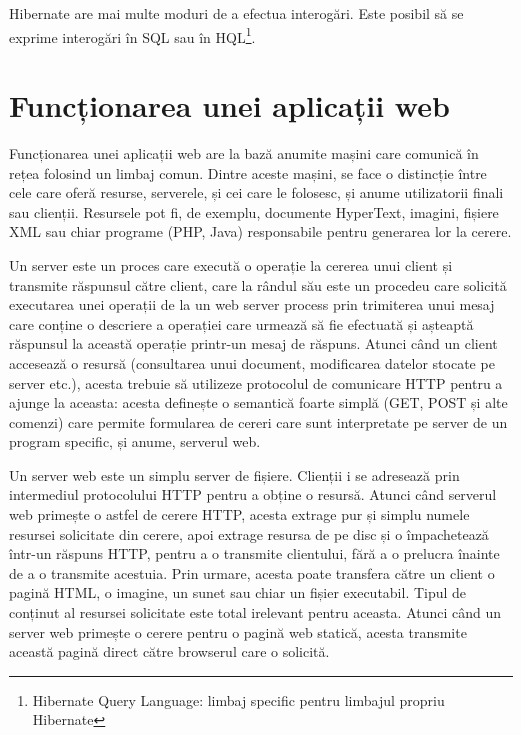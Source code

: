 Hibernate are mai multe moduri de a efectua interogări. Este posibil să se exprime interogări în SQL sau în HQL\footnote{Hibernate Query Language: limbaj specific pentru limbajul propriu Hibernate}.\newline

\section{Funcționarea unei aplicații web}

Funcționarea unei aplicații web are la bază anumite mașini care comunică în rețea folosind un limbaj comun.
Dintre aceste mașini, se face o distincție între cele care oferă resurse, serverele, și cei care le folosesc, și anume utilizatorii finali sau clienții. Resursele pot fi, de exemplu, documente HyperText, imagini, fișiere XML sau chiar programe (PHP, Java) responsabile pentru generarea lor la cerere.\newline

Un server este un proces care execută o operație la cererea unui client și transmite răspunsul către client, care la rândul său este un procedeu care solicită executarea unei operații de la un web server process prin trimiterea unui mesaj care conține o descriere a operației care urmează să fie efectuată și așteaptă răspunsul la această operație printr-un mesaj de răspuns.
Atunci când un client accesează o resursă (consultarea unui document, modificarea datelor stocate pe server etc.), acesta trebuie să utilizeze protocolul de comunicare HTTP pentru a ajunge la aceasta: acesta definește o semantică foarte simplă (GET, POST și alte comenzi) care permite formularea de cereri care sunt interpretate pe server de un program specific, și anume, serverul web.\newline

Un server web este un simplu server de fișiere. Clienții i se adresează prin intermediul protocolului HTTP pentru a obține o resursă. Atunci când serverul web primește o astfel de cerere HTTP, acesta extrage pur și simplu numele resursei solicitate din cerere, apoi extrage resursa de pe disc și o împachetează într-un răspuns HTTP, pentru a o transmite clientului, fără a o prelucra înainte de a o transmite acestuia. Prin urmare, acesta poate transfera către un client o pagină HTML, o imagine, un sunet sau chiar un fișier executabil. Tipul de conținut al resursei solicitate este total irelevant pentru aceasta.
Atunci când un server web primește o cerere pentru o pagină web statică, acesta transmite această pagină direct către browserul care o solicită.\newline

